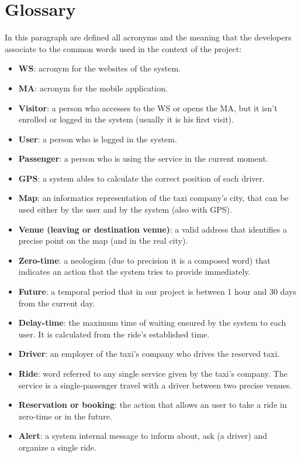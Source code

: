 \section{Glossary}
In this paragraph are defined all acronyms and the meaning that the developers associate to the common words used in the context of the project:
\begin{itemize}
	\item \textbf{WS}: acronym for the websites of the system.
	\item \textbf{MA}: acronym for the mobile application.
	\item \textbf{Visitor}: a person who accesses to the WS or opens the MA, but it isn't enrolled or logged in the system (usually it is his first visit).
	\item \textbf{User}: a person who is logged in the system.
	\item \textbf{Passenger}: a person who is using the service in the current moment.
	\item \textbf{GPS}: a system ables to calculate the correct position of each driver.
	\item \textbf{Map}: an informatics representation of the taxi company's city, that can be used either by the user and by the system (also with GPS). 
	\item \textbf{Venue (leaving or destination venue)}: a valid address that identifies a precise point on the map (and in the real city).
	\item \textbf{Zero-time}: a neologism (due to precision it is a composed word) that indicates an action that the system tries to provide immediately.
	\item \textbf{Future}: a temporal period that in our project is between 1 hour and 30 days from the current day.
	\item \textbf{Delay-time}: the maximum time of waiting ensured by the system to each user. It is calculated from the ride's established time.
	\item \textbf{Driver}: an employer of the taxi's company who drives the reserved taxi.
	\item \textbf{Ride}: word referred to any single service given by the taxi's company. The service is a single-passenger travel with a driver between two precise venues.
	\item \textbf{Reservation or booking}: the action that allows an user to take a ride in zero-time or in the future.
	\item \textbf{Alert}: a system internal message to inform about, ask (a driver) and organize a single ride.
\end{itemize}

